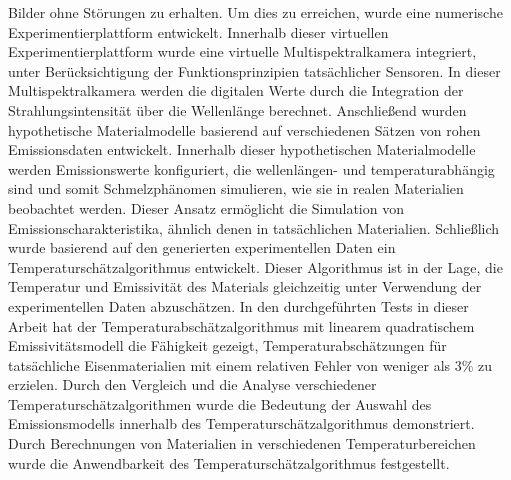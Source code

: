 {	Bilder ohne Störungen zu erhalten. Um dies zu erreichen, wurde eine numerische 
	Experimentierplattform entwickelt. Innerhalb dieser virtuellen Experimentierplattform 
	wurde eine virtuelle Multispektralkamera integriert, unter Berücksichtigung der 
	Funktionsprinzipien tatsächlicher Sensoren. In dieser Multispektralkamera werden die 
	digitalen Werte durch die Integration der Strahlungsintensität über die Wellenlänge 
	berechnet. Anschließend wurden hypothetische Materialmodelle basierend auf verschiedenen 
	Sätzen von rohen Emissionsdaten entwickelt. Innerhalb dieser hypothetischen Materialmodelle 
	werden Emissionswerte konfiguriert, die wellenlängen- und temperaturabhängig sind und 
	somit Schmelzphänomen simulieren, wie sie in realen Materialien beobachtet werden. 
	Dieser Ansatz ermöglicht die Simulation von Emissionscharakteristika, ähnlich denen in 
	tatsächlichen Materialien. Schließlich wurde basierend auf den generierten experimentellen 
	Daten ein Temperaturschätzalgorithmus entwickelt. Dieser Algorithmus ist in der Lage, 
	die Temperatur und Emissivität des Materials gleichzeitig unter Verwendung der 
	experimentellen Daten abzuschätzen. 
	In den durchgeführten Tests in dieser Arbeit hat der Temperaturabschätzalgorithmus mit 
	linearem quadratischem Emissivitätsmodell die Fähigkeit gezeigt, Temperaturabschätzungen 
	für tatsächliche Eisenmaterialien mit einem relativen Fehler von weniger als 3\% zu erzielen.
	Durch den Vergleich und die Analyse 
	verschiedener Temperaturschätzalgorithmen wurde die Bedeutung der Auswahl 
	des Emissionsmodells innerhalb des Temperaturschätzalgorithmus demonstriert. 
	Durch Berechnungen von Materialien in verschiedenen Temperaturbereichen wurde die 
	Anwendbarkeit des Temperaturschätzalgorithmus festgestellt.%
	\thispagestyle{empty}
}%
%
%